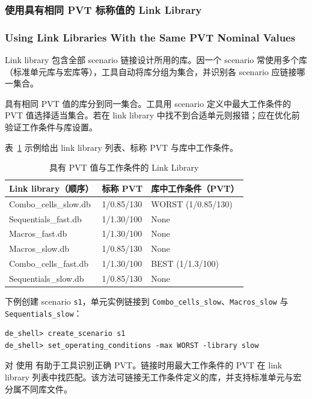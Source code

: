 \subsubsection{使用具有相同 PVT 标称值的 Link Library}
\subsubsection*{Using Link Libraries With the Same PVT Nominal Values}

Link library 包含全部 scenario 链接设计所用的库。因一个 scenario 常使用多个库（标准单元库与宏库等），工具自动将库分组为集合，并识别各 scenario 应链接哪一集合。

具有相同 PVT 值的库分到同一集合。工具用 scenario 定义中最大工作条件的 PVT 值选择适当集合。若在 link library 中找不到合适单元则报错；应在优化前验证工作条件与库设置。

表~\ref{tab:dce-link-pvt} 示例给出 link library 列表、标称 PVT 与库中工作条件。

\begin{table}[htbp]
\centering
\caption{具有 PVT 值与工作条件的 Link Library}
\label{tab:dce-link-pvt}
\small
\begin{tabular}{@{}lll@{}}
\toprule
Link library（顺序） & 标称 PVT & 库中工作条件（PVT） \\
\midrule
Combo\_cells\_slow.db & 1/0.85/130 & WORST (1/0.85/130) \\
Sequentials\_fast.db & 1/1.30/100 & None \\
Macros\_fast.db & 1/1.30/100 & None \\
Macros\_slow.db & 1/0.85/130 & None \\
Combo\_cells\_fast.db & 1/1.30/100 & BEST (1/1.3/100) \\
Sequentials\_slow.db & 1/0.85/130 & None \\
\bottomrule
\end{tabular}
\end{table}

下例创建 scenario \texttt{s1}，单元实例链接到 \texttt{Combo\_cells\_slow}、\texttt{Macros\_slow} 与 \texttt{Sequentials\_slow}：
\begin{lstlisting}
de_shell> create_scenario s1
de_shell> set_operating_conditions -max WORST -library slow
\end{lstlisting}

对  使用  有助于工具识别正确 PVT。链接时用最大工作条件的 PVT 在 link library 列表中找匹配。该方法可链接无工作条件定义的库，并支持标准单元与宏分属不同库文件。

